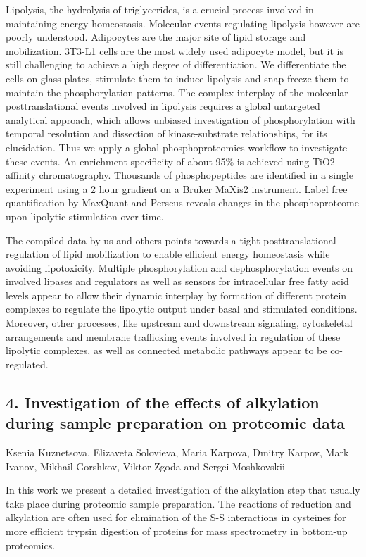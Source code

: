 Lipolysis, the hydrolysis of triglycerides, is a crucial process involved in maintaining energy homeostasis. Molecular events regulating lipolysis however are poorly understood. Adipocytes are the major site of lipid storage and mobilization. 3T3-L1 cells are the most widely used adipocyte model, but it is still challenging to achieve a high degree of differentiation. We differentiate the cells on glass plates, stimulate them to induce lipolysis and snap-freeze them to maintain the phosphorylation patterns. The complex interplay of the molecular posttranslational events involved in lipolysis requires a global untargeted analytical approach, which allows unbiased investigation of phosphorylation with temporal resolution and dissection of kinase-substrate relationships, for its elucidation. Thus we apply a global phosphoproteomics workflow to investigate these events. An enrichment specificity of about 95\% is achieved using TiO2 affinity chromatography. Thousands of phosphopeptides are identified in a single experiment using a 2 hour gradient on a Bruker MaXis2 instrument. Label free quantification by MaxQuant and Perseus reveals changes in the phosphoproteome upon lipolytic stimulation over time.

The compiled data by us and others points towards a tight posttranslational regulation of lipid mobilization to enable efficient energy homeostasis while avoiding lipotoxicity. Multiple phosphorylation and dephosphorylation events on involved lipases and regulators as well as sensors for intracellular free fatty acid levels appear to allow their dynamic interplay by formation of different protein complexes to regulate the lipolytic output under basal and stimulated conditions. Moreover, other processes, like upstream and downstream signaling, cytoskeletal arrangements and membrane trafficking events involved in regulation of these lipolytic complexes, as well as connected metabolic pathways appear to be co-regulated.

\subsection*{\color{eubicRed} 4. Investigation of the effects of alkylation during sample preparation on proteomic data}
{\color{eubicGray}Ksenia Kuznetsova, Elizaveta Solovieva, Maria Karpova, Dmitry Karpov, Mark Ivanov, Mikhail Gorshkov, Viktor Zgoda and Sergei Moshkovskii}

In this work we present a detailed investigation of the alkylation step that usually take place during proteomic sample preparation. The reactions of reduction and alkylation are often used for elimination of the S-S interactions in cysteines for more efficient trypsin digestion of proteins for mass spectrometry in bottom-up proteomics.

